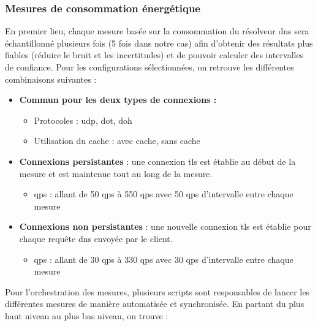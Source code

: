 \documentclass[12pt, a4paper]{report}
\begin{document}
	\subsubsection{Mesures de consommation énergétique}
	En premier lieu, chaque mesure basée sur la consommation du résolveur \gls{dns} sera échantillonné plusieurs fois (5 fois dans notre cas) afin d'obtenir des résultats plus fiables (réduire le bruit et les incertitudes) et de pouvoir calculer des intervalles de confiance. 
	Pour les configurations sélectionnées, on retrouve les différentes combinaisons suivantes :
	\begin{itemize}
		\item \textbf{Commun pour les deux types de connexions : }
		\begin{itemize}
			\item Protocoles : \gls{udp}, \gls{dot}, \gls{doh}
			\item Utilisation du cache : avec cache, sans cache
		\end{itemize}

		\item \textbf{Connexions persistantes} : une connexion \gls{tls} est établie au début de la mesure et est maintenue tout au long de la mesure.
		\begin{itemize}
			\item \gls{qps} : allant de 50 \gls{qps} à 550 \gls{qps} avec 50 \gls{qps} d'intervalle entre chaque mesure
		\end{itemize}
		\item \textbf{Connexions non persistantes} : une nouvelle connexion \gls{tls} est établie pour chaque requête \gls{dns} envoyée par le client.
		\begin{itemize}
			\item \gls{qps} : allant de 30 \gls{qps} à 330 \gls{qps} avec 30 \gls{qps} d'intervalle entre chaque mesure
		\end{itemize}
	\end{itemize}
	\vspace{0.5cm}

	Pour l'orchestration des mesures, plusieurs scripts sont responsables de lancer les différentes mesures de manière automatisée et synchronisée. En partant du plus haut niveau au plus bas niveau, on trouve :
\end{document}
